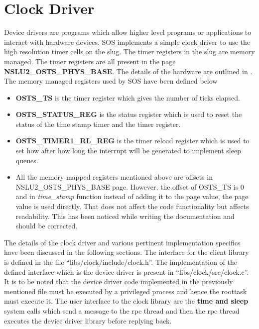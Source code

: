 \documentclass[a4paper, 11pt]{article}
\begin{document}
\newpage
\section{Clock Driver}
Device drivers are programs which allow higher level programs or
applications to interact with hardware devices. SOS implements a
simple clock driver to use the high resolution timer cells on the
slug. The timer registers in the slug are memory managed. The timer
registers are all present in the page {\bf NSLU2\_OSTS\_PHYS\_BASE}. The
details of the hardware are outlined in \cite[Page
  411]{slug-manual}. The memory managed registers used by SOS have
been defined below
\begin{itemize}
\item {\bf OSTS\_TS} is the timer register which gives the number of
  ticks elapsed.
\item {\bf OSTS\_STATUS\_REG} is the status register which is used to
  reset the status of the time stamp timer and the timer register. 
\item {\bf OSTS\_TIMER1\_RL\_REG} is the timer reload register which is
  used to set how after how long the interrupt will be generated to
  implement sleep queues. 
\item All the memory mapped registers mentioned above are offsets in
  NSLU2\_OSTS\_PHYS\_BASE page. However, the offset of OSTS\_TS is 0 and
  in \textit{time\_stamp} function instead of adding it to the page value, the
  page value is used directly. That does not affect the code
  functionality but affects readability. This has been noticed while
  writing the documentation and should be corrected.
\end{itemize}
The details of the clock driver and various pertinent implementation
specifics have been discussed in the following sections. The interface
for the client library is defined in the file
``libs/clock/include/clock.h''. The implementation of the defined
interface which is the device driver is present in
``libs/clock/src/clock.c''. It is to be noted that the device driver code
implemented in the previously mentioned file must be executed by a
privileged process and hence the roottask must execute it. The user
interface to the clock library are the {\bf time and sleep} system
calls which send a message to the rpc thread and then the rpc thread
executes the device driver library before replying back. 
\end{document}
